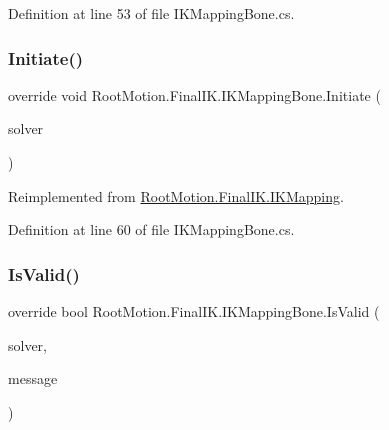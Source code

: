 Definition at line 53 of file I\+K\+Mapping\+Bone.\+cs.

\mbox{\label{class_root_motion_1_1_final_i_k_1_1_i_k_mapping_bone_a7eea7aefe2699d7b01ebafe17543c6bd}} 
\subsubsection{\texorpdfstring{Initiate()}{Initiate()}}
{\footnotesize\ttfamily override void Root\+Motion.\+Final\+I\+K.\+I\+K\+Mapping\+Bone.\+Initiate (\begin{DoxyParamCaption}\item[{\mbox{\hyperlink{class_root_motion_1_1_final_i_k_1_1_i_k_solver_full_body}{I\+K\+Solver\+Full\+Body}}}]{solver }\end{DoxyParamCaption})\hspace{0.3cm}{\ttfamily [virtual]}}



Reimplemented from \mbox{\hyperlink{class_root_motion_1_1_final_i_k_1_1_i_k_mapping_a530ab0e13f90bde214eba3a23ed24d73}{Root\+Motion.\+Final\+I\+K.\+I\+K\+Mapping}}.



Definition at line 60 of file I\+K\+Mapping\+Bone.\+cs.

\mbox{\label{class_root_motion_1_1_final_i_k_1_1_i_k_mapping_bone_ae6cdd8926b914a52dcef66e131733bd3}} 
\subsubsection{\texorpdfstring{Is\+Valid()}{IsValid()}}
{\footnotesize\ttfamily override bool Root\+Motion.\+Final\+I\+K.\+I\+K\+Mapping\+Bone.\+Is\+Valid (\begin{DoxyParamCaption}\item[{\mbox{\hyperlink{class_root_motion_1_1_final_i_k_1_1_i_k_solver}{I\+K\+Solver}}}]{solver,  }\item[{ref string}]{message }\end{DoxyParamCaption})\hspace{0.3cm}{\ttfamily [virtual]}}



